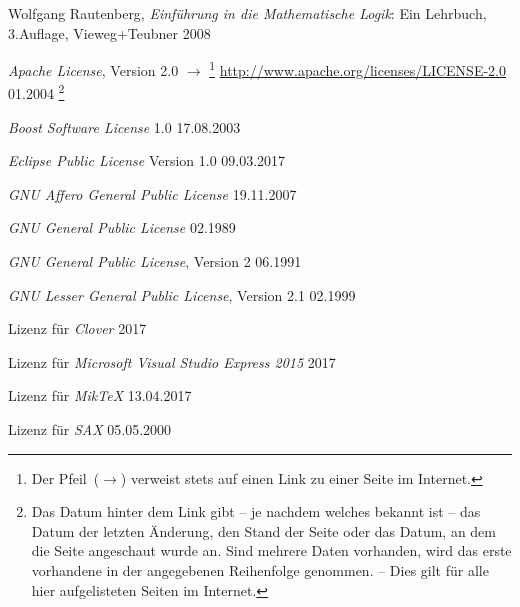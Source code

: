 \begin{flushleft}
	\begin{thebibliography}{12}
		\likesection{\bibname}           %
		\label{dic-Literaturverzeichnis} %

		Wolfgang Rautenberg,
		\emph{Einführung in die Mathematische Logik}:
		Ein Lehrbuch, 3.\@ Auflage, Vieweg+Teubner 2008

		\emph{Apache License}, Version 2.0
		$\rightarrow$%
		\footnote{%
			Der Pfeil~($\rightarrow$) verweist stets auf einen Link zu einer Seite im Internet.
		}
		\url{http://www.apache.org/licenses/LICENSE-2.0}
		01.2004%
		\footnote{%
			Das Datum hinter dem Link gibt -- je nachdem welches bekannt ist -- das Datum der letzten Änderung, den Stand der Seite oder das Datum, an dem die Seite angeschaut wurde an.
			Sind mehrere Daten vorhanden, wird das erste vorhandene in der angegebenen Reihenfolge genommen.
			-- Dies gilt für alle hier aufgelisteten Seiten im Internet.
		}

		\emph{Boost Software License} 1.0
		17.08.2003

		\emph{Eclipse Public License} Version 1.0
		09.03.2017

		\emph{GNU Affero General Public License}
		19.11.2007

		\emph{GNU General Public License}
		02.1989

		\emph{GNU General Public License}, Version 2
		06.1991

		\emph{GNU Lesser General Public License},
		Version 2.1
		02.1999

		Lizenz für \emph{Clover}
		2017

		Lizenz
		für \emph{Microsoft Visual Studio Express 2015}
		2017

		Lizenz für \emph{MikTeX}
		13.04.2017

		Lizenz für \emph{SAX}
		05.05.2000


\end{thebibliography}
\end{flushleft}
